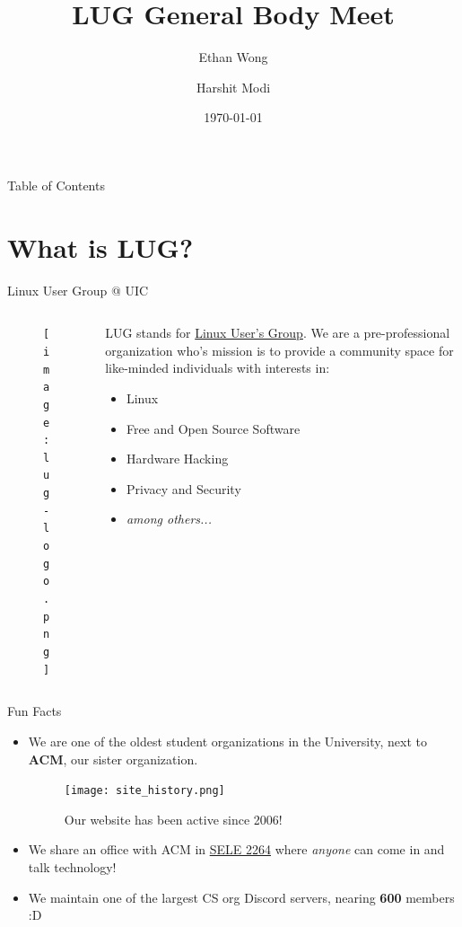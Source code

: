 \documentclass{beamer}
\title{LUG General Body Meet}
\author{Ethan Wong \and Harshit Modi}
\date{\today}
\institute{Linux Users Group @ UIC}
\begin{document}
\begin{frame}
	\titlepage
\end{frame}

\begin{frame}{Table of Contents}
	\tableofcontents[pausesections]
\end{frame}

\section{What is LUG?}
\begin{frame}{Linux User Group @ UIC}
	\begin{columns}
		\begin{column}{0.5\textwidth}
			\begin{figure}
				\centering
				\texttt{[image: lug-logo.png]}
			\end{figure}
		\end{column}
		\begin{column}{0.5\textwidth}
			LUG stands for \underline{Linux User's Group}.
			\pause We are a pre-professional organization who's mission is to
			provide a community space for like-minded individuals with interests
			in:
			\begin{itemize}
				\item Linux
				\item Free and Open Source Software
				\item Hardware Hacking
				\item Privacy and Security
				\item \textit{among others...}
			\end{itemize}
		\end{column}
	\end{columns}
\end{frame}

\begin{frame}{Fun Facts}
	\begin{itemize}
		\item We are one of the oldest student organizations in the University,
			next to \textbf{ACM}, our sister organization.
			\pause
			\begin{figure}
				\centering
				\texttt{[image: site\_history.png]}
				\caption{Our website has been active since 2006!}
			\end{figure}
			\pause
		\item We share an office with ACM in \underline{SELE 2264}
			where \textit{anyone} can come in and talk technology!
			\pause
		\item We maintain one of the largest CS org Discord servers,
			nearing \textbf{600} members :D
	\end{itemize}
\end{frame}
\end{document}
